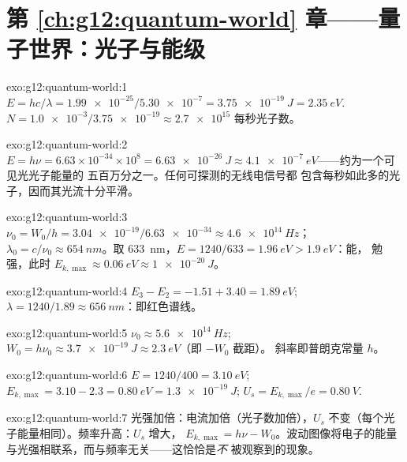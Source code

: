 \section*{第 \ref{ch:g12:quantum-world} 章——量子世界：光子与能级}

\begin{solution}{exo:g12:quantum-world:1}
$E = hc/\lambda = \num{1.99e-25}/\num{5.30e-7} = \qty{3.75e-19}{J} =
\qty{2.35}{eV}$. $N = \num{1.0e-3}/\num{3.75e-19} \approx \num{2.7e15}$
每秒光子数。
\end{solution}

\begin{solution}{exo:g12:quantum-world:2}
$E = h\nu = 6.63\times10^{-34} \times 10^{8} = \qty{6.63e-26}{J}
\approx \qty{4.1e-7}{eV}$——约为一个可见光光子能量的
五百万分之一。任何可探测的无线电信号都
包含每秒如此多的光子，因而其光流十分平滑。
\end{solution}

\begin{solution}{exo:g12:quantum-world:3}
$\nu_0 = W_0/h = \num{3.04e-19}/\num{6.63e-34} \approx
\qty{4.6e14}{Hz}$；$\lambda_0 = c/\nu_0 \approx \qty{654}{nm}$。取
\qty{633}{nm}，$E = 1240/633 = \qty{1.96}{eV} > \qty{1.9}{eV}$：能，
勉强，此时 $E_{k,\max} \approx \qty{0.06}{eV} \approx \qty{1e-20}{J}$。
\end{solution}

\begin{solution}{exo:g12:quantum-world:4}
$E_3 - E_2 = -1.51 + 3.40 = \qty{1.89}{eV}$;
$\lambda = 1240/1.89 \approx \qty{656}{nm}$：即红色谱线。
\end{solution}

\begin{solution}{exo:g12:quantum-world:5}
$\nu_0 \approx \qty{5.6e14}{Hz}$; $W_0 = h\nu_0 \approx
\qty{3.7e-19}{J} \approx \qty{2.3}{eV}$（即 $-W_0$ 截距）。
斜率即普朗克常量 $h$。
\end{solution}

\begin{solution}{exo:g12:quantum-world:6}
$E = 1240/400 = \qty{3.10}{eV}$; $E_{k,\max} = 3.10 - 2.3 =
\qty{0.80}{eV} = \qty{1.3e-19}{J}$; $U_s = E_{k,\max}/e =
\qty{0.80}{V}$.
\end{solution}

\begin{solution}{exo:g12:quantum-world:7}
光强加倍：电流加倍（光子数加倍），$U_s$
不变（每个光子能量相同）。频率升高：$U_s$ 增大，
$E_{k,\max} = h\nu - W_0$。波动图像将电子的能量
与光强相联系，而与频率无关——这恰恰是\emph{不}
被观察到的现象。
\end{solution}

